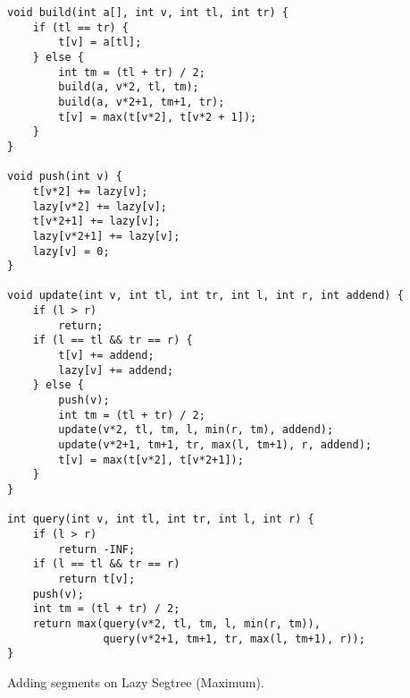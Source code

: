 \documentclass{article}
\begin{document}
\begin{lstlisting}
void build(int a[], int v, int tl, int tr) {
    if (tl == tr) {
        t[v] = a[tl];
    } else {
        int tm = (tl + tr) / 2;
        build(a, v*2, tl, tm);
        build(a, v*2+1, tm+1, tr);
        t[v] = max(t[v*2], t[v*2 + 1]);
    }
}

void push(int v) {
    t[v*2] += lazy[v];
    lazy[v*2] += lazy[v];
    t[v*2+1] += lazy[v];
    lazy[v*2+1] += lazy[v];
    lazy[v] = 0;
}

void update(int v, int tl, int tr, int l, int r, int addend) {
    if (l > r) 
        return;
    if (l == tl && tr == r) {
        t[v] += addend;
        lazy[v] += addend;
    } else {
        push(v);
        int tm = (tl + tr) / 2;
        update(v*2, tl, tm, l, min(r, tm), addend);
        update(v*2+1, tm+1, tr, max(l, tm+1), r, addend);
        t[v] = max(t[v*2], t[v*2+1]);
    }
}

int query(int v, int tl, int tr, int l, int r) {
    if (l > r)
        return -INF;
    if (l == tl && tr == r)
        return t[v];
    push(v);
    int tm = (tl + tr) / 2;
    return max(query(v*2, tl, tm, l, min(r, tm)), 
               query(v*2+1, tm+1, tr, max(l, tm+1), r));
}
\end{lstlisting}

Adding segments on Lazy Segtree (Maximum).
\end{document}
